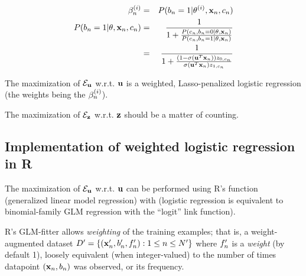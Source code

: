 \documentclass{article}
\begin{document}
\begin{eqnarray*}
  \\
  \beta^{(i )}_{n}
  & = &
  P(b_{n} = 1 | \theta^{(i)}, {\bf x}_{n}, c_{n})
  \\
  P(b_{n} = 1 | \theta, {\bf x}_{n}, c_{n})
  & = &
  \frac{1}{1 + \frac{P(c_{n}, b_{n} = 0 | \theta, {\bf x}_{n})}
    {P(c_{n}, b_{n} = 1 | \theta, {\bf x}_{n})}}
  \\
  & = &
  \frac{1}{1 + \frac{(1 - \sigma\left({\bf u}^T {\bf x}_{n}\right)) z_{0,c_{n}}}
    {\sigma\left({\bf u}^T {\bf x}_{n}\right) z_{1,c_{n}}}}
\end{eqnarray*}

The maximization of ${\cal E}_{{\bf u}}$ w.r.t. ${\bf u}$ is a weighted, Lasso-penalized logistic regression
(the weights being the $\beta^{(i )}_{n}$).

The maximization of ${\cal E}_{{\bf z}}$ w.r.t. ${\bf z}$ should be a matter of counting.

\subsection{Implementation of weighted logistic regression in R}

The maximization of ${\cal E}_{{\bf u}}$ w.r.t. ${\bf u}$ can be performed using R's  function (generalized linear model regression)
with 
(logistic regression is equivalent to binomial-family GLM regression with the ``logit'' link function).

R's GLM-fitter allows {\em weighting} of the training examples;
that is, a weight-augmented dataset $D' = \{ ({\bf x}'_{n},b'_{n},f'_{n}): 1 \leq n \leq N' \}$
where $f'_{n}$ is a {\em weight} (by default 1),
loosely equivalent (when integer-valued) to the number of times datapoint $({\bf x}_{n},b_{n})$ was observed, or its frequency.
\end{document}
